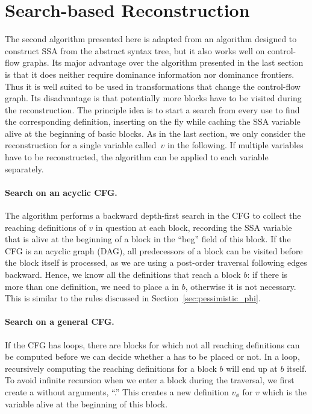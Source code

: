 {\section{Search-based Reconstruction}


The second algorithm presented here is adapted from an algorithm designed to construct SSA from the abstract syntax tree, but it also works well on control-flow graphs.
Its major advantage over the algorithm presented in the last section is that it does neither require dominance information nor dominance frontiers.
Thus it is well suited to be used in transformations that change the control-flow graph.
Its disadvantage is that potentially more blocks have to be visited during the reconstruction.
The principle idea is to start a search from every use to find the corresponding definition, inserting \phifuns on the fly while caching the SSA variable alive at the beginning of basic blocks.
As in the last section, we only consider the reconstruction for a single variable called~$v$ in the following.
If multiple variables have to be reconstructed, the algorithm can be applied to each variable separately.

\paragraph{Search on an acyclic CFG.}
The algorithm performs a backward depth-first search in the CFG to collect the reaching definitions of $v$ in question at each block,
recording the SSA variable that is alive at the beginning of a block in the ``beg'' field of this block.
If the CFG is an acyclic graph (DAG), all predecessors of a block can be visited before the block itself is processed, as we are using a post-order traversal following edges backward.
Hence, we know all the definitions that reach a block $b$: if there is more than one definition, we need to place a \phifun in $b$, otherwise it is not necessary.
This is similar to the rules discussed in Section~\ref{sec:pessimistic_phi}.

\paragraph{Search on a general CFG.}
If the CFG has loops, there are blocks for which not all reaching definitions can be computed before we can decide whether a \phifun has to be placed or not.
In a loop, recursively computing the reaching definitions for a block $b$ will end up at $b$ itself.
To avoid infinite recursion when we enter a block during the traversal, we first create a \phifun without arguments, ``\pendphi.''
This creates a new definition $v_\phi$ for $v$ which is the variable alive at the beginning of this block.

}
